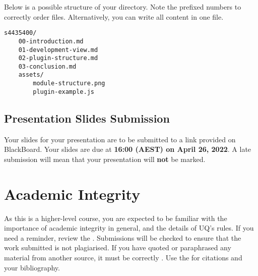 \documentclass{csse4400}
\begin{document}
\noindent
Below is a possible structure of your directory. Note the prefixed numbers to correctly order files.
Alternatively, you can write all content in one file.

\begin{verbatim}
s4435400/
    00-introduction.md
    01-development-view.md
    02-plugin-structure.md
    03-conclusion.md
    assets/
        module-structure.png
        plugin-example.js
\end{verbatim}

\subsection{Presentation Slides Submission}
Your slides for your presentation are to be submitted to a link provided on BlackBoard.
Your slides are due at \textbf{16:00 (AEST) on April 26, 2022}. A late submission will mean that your presentation will \textbf{not} be marked.


\section{Academic Integrity}
As this is a higher-level course, you are expected to be familiar with the importance of academic integrity in general, and the details of UQ's rules.
If you need a reminder, review the .
Submissions will be checked to ensure that the work submitted is not plagiarised.
If you have quoted or paraphrased any material from another source, it must be correctly .
Use the  for citations and your bibliography.



\end{document}
